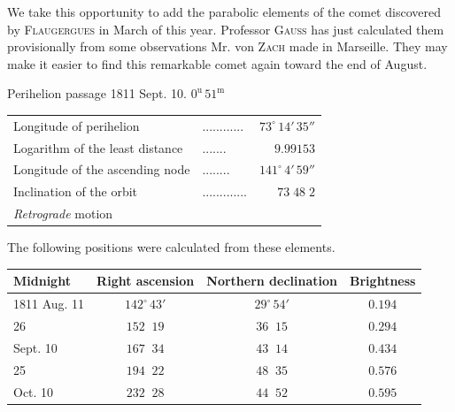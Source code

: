 \par\indent We take this opportunity to add the parabolic elements of the comet discovered by \textsc{Flaugergues} in March of this year. Professor \textsc{Gauss} has just calculated them provisionally from some observations Mr. von \textsc{Zach} made in Marseille. They may make it easier to find this remarkable comet again toward the end of August.
\begin{center}Perihelion passage 1811 Sept. 10. $0^{\mathrm u}\,51^{\mathrm m}$\end{center}

\begin{center}\fontsize{10}{12}\selectfont\setlength{\tabcolsep}{4pt}\renewcommand{\arraystretch}{1.15}\begin{tabular}{llr}
Longitude of perihelion & .\;.\;.\;.\;.\;.\;.\;.\;.\;.\;.\;. & $73^\circ\,14'\,35''$\\
Logarithm of the least distance & .\;.\;.\;.\;.\;.\;. & $9.99153$\\
Longitude of the ascending node & .\;.\;.\;.\;.\;.\;.\;. & $141^\circ\,4'\,59''$\\
Inclination of the orbit & .\;.\;.\;.\;.\;.\;.\;.\;.\;.\;.\;.\;. & $73\;48\;2$\\
\emph{Retrograde} motion &  & \\
\end{tabular}\end{center}

\par\indent The following positions were calculated from these elements.
\begin{center}\fontsize{10}{12}\selectfont\setlength{\tabcolsep}{4pt}\renewcommand{\arraystretch}{1.15}
\begin{tabular}{l|cc|c}
Midnight & Right ascension & Northern declination & Brightness \\
\hline
1811 Aug. 11 & $142^\circ\,43'$ & $29^\circ\,54'$ & $0.194$ \\
\phantom{1811 }\phantom{Aug. }26 & $152\;\;19$ & $36\;\;15$ & $0.294$ \\
Sept. 10 & $167\;\;34$ & $43\;\;14$ & $0.434$ \\
\phantom{Sept. }25 & $194\;\;22$ & $48\;\;35$ & $0.576$ \\
Oct. 10 & $232\;\;28$ & $44\;\;52$ & $0.595$ \\
\end{tabular}
\end{center}


